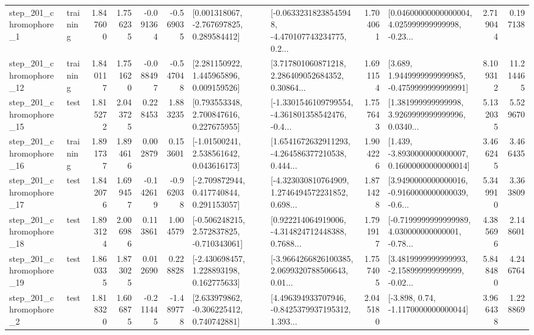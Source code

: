\begin{tabular}{llrrrrllrlrr}
   step\_201\_chromophore\_1 &  training &      1.847600 &    1.756235 &     -0.091364 & -0.569035 &    [0.001318067, -2.767697825, 0.289584412] &  [-0.06332318238545948, -4.470107743234775, 0.2... &       1.704061 &  [0.04600000000000004, 4.025999999999998, -0.23... &            2.719044 &          0.197138 \\
  step\_201\_chromophore\_12 &  training &      1.840117 &    1.751620 &     -0.088497 & -0.547048 &     [2.281150922, 1.445965896, 0.009159526] &  [3.717801060871218, 2.286409052684352, 0.30864... &       1.691154 &   [3.689, 1.9449999999999985, -0.4759999999999991] &            8.109312 &         11.214465 \\
  step\_201\_chromophore\_15 &      test &      1.815272 &    2.043725 &      0.228453 &  1.883235 &     [0.793553348, 2.700847616, 0.227675955] &  [-1.3301546109799554, -4.361801358542476, -0.4... &       1.757643 &  [1.381999999999998, 3.9269999999999996, 0.0340... &            5.132035 &          5.529670 \\
  step\_201\_chromophore\_16 &  training &      1.891737 &    1.894616 &      0.002879 &  0.153601 &     [-1.01500241, 2.538561642, 0.043616173] &  [1.6541672632911293, -4.264586377210538, 0.444... &       1.904226 &  [1.439, -3.8930000000000007, 0.16000000000000014] &            3.466245 &          3.466435 \\
  step\_201\_chromophore\_17 &      test &      1.842076 &    1.699457 &     -0.142619 & -0.962038 &    [-2.709872944, 0.417740844, 0.291153057] &  [-4.323030810764909, 1.2746494572231852, 0.698... &       1.871428 &  [3.9490000000000016, -0.9160000000000039, -0.6... &            5.349910 &          3.363809 \\
  step\_201\_chromophore\_18 &      test &      1.893124 &    2.006986 &      0.113861 &  1.004579 &   [-0.506248215, 2.572837825, -0.710343061] &  [0.922214064919006, -4.314824712448388, 0.7688... &       1.791917 &  [-0.7199999999999989, 4.030000000000001, -0.78... &            4.385696 &          2.148601 \\
  step\_201\_chromophore\_19 &      test &      1.860335 &    1.873025 &      0.012690 &  0.228828 &    [-2.430698457, 1.228893198, 0.162775633] &  [-3.9664266826100385, 2.0699320788506643, 0.01... &       1.757405 &  [3.4819999999999993, -2.158999999999999, -0.02... &            5.848480 &          4.246764 \\
   step\_201\_chromophore\_2 &      test &      1.818320 &    1.606875 &     -0.211445 & -1.489778 &    [2.633979862, -0.306225412, 0.740742881] &  [4.496394933707946, -0.8425379937195312, 1.393... &       2.045180 &                [-3.898, 0.74, -1.1170000000000044] &            3.966438 &          1.228869 \\

\end{tabular}
